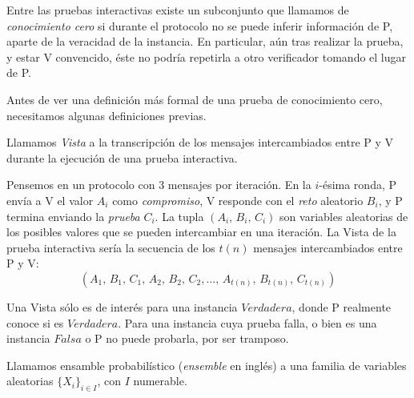 


Entre las pruebas interactivas existe un subconjunto que llamamos de \textit{conocimiento cero} si durante el protocolo no se puede inferir información de P, aparte de la veracidad de la instancia. En particular, aún tras realizar la prueba, y estar V convencido, éste no podría repetirla a otro verificador tomando el lugar de P.

\hfil

Antes de ver una definición más formal de una prueba de conocimiento cero, necesitamos algunas definiciones previas.



\begin{definition}
	Llamamos \textit{Vista} a la transcripción de los mensajes intercambiados entre P y V durante la ejecución de una prueba interactiva.
\end{definition}


Pensemos en un protocolo con 3 mensajes por iteración. En la $i$-ésima ronda, P envía a V el valor $A_i$ como \textit{compromiso}, V responde con el \textit{reto} aleatorio $B_i$, y P termina enviando la \textit{prueba} $C_i$. La tupla $(A_i,\,B_i,\,C_i)$ son variables aleatorias de los posibles valores que se pueden intercambiar en una iteración. La Vista de la prueba interactiva sería la secuencia de los $t(n)$ mensajes intercambiados entre P y V:
\[(A_1,\,B_1,\,C_1,\,A_2,\,B_2,\,C_2,\dots ,\,A_{t(n)},\,B_{t(n)},\,C_{t(n)})\]


Una Vista sólo es de interés para una instancia $Verdadera$, donde P realmente conoce si es $Verdadera$. Para una instancia cuya prueba falla, o bien es una instancia $Falsa$ o P no puede probarla, por ser tramposo.


\begin{definition}
	Llamamos ensamble probabilístico (\textit{ensemble} en inglés) a una familia de variables aleatorias $\{X_i\}_{i\in I}$, con $I$ numerable.
\end{definition}

